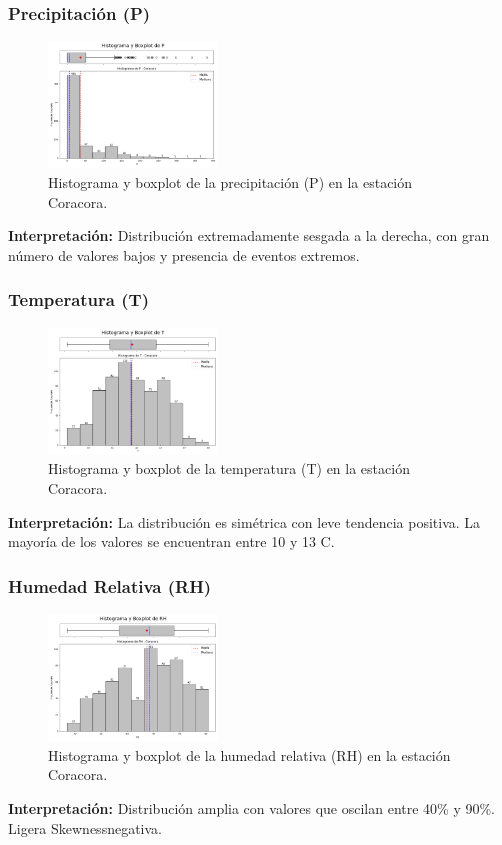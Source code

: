 \subsubsection*{Precipitación (P)}
\begin{figure}[H]
\centering
\includegraphics[width=0.4\textwidth]{resultados/por_estacion_meteorologica/Coracora/P_histograma.png}
\caption{Histograma y boxplot de la precipitación (P) en la estación Coracora.}
\label{fig:coracora_P}
\end{figure}
\textbf{Interpretación:} Distribución extremadamente sesgada a la derecha, con gran número de valores bajos y presencia de eventos extremos.

\subsubsection*{Temperatura (T)}
\begin{figure}[H]
\centering
\includegraphics[width=0.4\textwidth]{resultados/por_estacion_meteorologica/Coracora/T_histograma.png}
\caption{Histograma y boxplot de la temperatura (T) en la estación Coracora.}
\label{fig:coracora_T}
\end{figure}
\textbf{Interpretación:} La distribución es simétrica con leve tendencia positiva. La mayoría de los valores se encuentran entre 10 y 13 \textdegree C.

\subsubsection*{Humedad Relativa (RH)}
\begin{figure}[H]
\centering
\includegraphics[width=0.4\textwidth]{resultados/por_estacion_meteorologica/Coracora/RH_histograma.png}
\caption{Histograma y boxplot de la humedad relativa (RH) en la estación Coracora.}
\label{fig:coracora_RH}
\end{figure}
\textbf{Interpretación:} Distribución amplia con valores que oscilan entre 40\% y 90\%. Ligera Skewnessnegativa.

